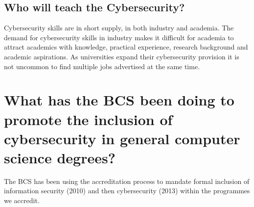 \documentclass[a4paper,11pt]{article}
\begin{document}
\subsection*{Who will teach the Cybersecurity?}\label{sec:staffing}

Cybersecurity skills are in short supply, in both industry and academia. The demand for cybersecurity skills in industry makes it difficult for academia to attract academics with knowledge, practical experience, research background and academic aspirations. As universities expand their cybersecurity provision it is not uncommon to find multiple jobs advertised at the same time. 

\section*{What has the BCS been doing to promote the inclusion of cybersecurity in general computer science degrees? }

 The BCS has been using the accreditation process to mandate formal inclusion of information security (2010) and then cybersecurity (2013) within the programmes we accredit. 

\end{document}
